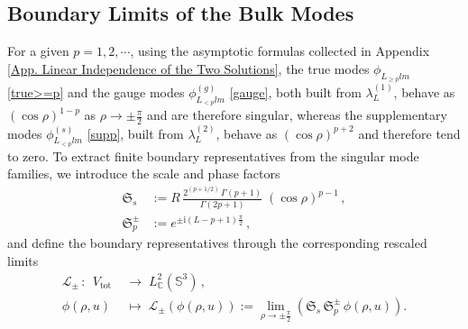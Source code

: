 \documentclass[aps,twocolumn,nofootinbib]{revtex4}
\begin{document}
\subsection{Boundary Limits of the Bulk Modes}

For a given $p=1,2,\cdots$, using the asymptotic formulas collected in Appendix \ref{App. Linear Independence of the Two Solutions}, the true modes $\phi^{}_{L^{}_{\geqslant p}lm}$ \eqref{true>=p} and the gauge modes $\phi^{(g)}_{L^{}_{<p}lm}$ \eqref{gauge}, both built from $\lambda_L^{(1)}$, behave as $(\cos\rho)^{1-p}$ as $\rho\longrightarrow\pm\frac{\pi}{2}$ and are therefore singular, whereas the supplementary modes $\phi^{(s)}_{L^{}_{<p}lm}$ \eqref{supp}, built from $\lambda_L^{(2)}$, behave as $(\cos\rho)^{p+2}$ and therefore tend to zero. To extract finite boundary representatives from the singular mode families, we introduce the scale and phase factors
\begin{align}
    \mathfrak{S}^{}_s &:= R\, \frac{2^{(p+{1}/{2})}\, \Gamma(p+1)}{\Gamma(2p+1)}\; (\cos\rho)^{p-1}\,, \\[3pt]
    \mathfrak{S}^{\pm}_p &:= e^{\pm\mathrm{i}(L-p+1)\frac{\pi}{2}} \,,
\end{align}
and define the boundary representatives through the corresponding rescaled limits
\begin{align}\label{eq:L-def}
    \!\mathcal{L}_\pm \,\colon\;\, V_{\text{tot}} &\;\longrightarrow\; L^2_{\mathbb{C}}(\mathbb{S}^3)\,, \nonumber\\[3pt]
    \phi(\rho,u) &\;\longmapsto\; \mathcal{L}_\pm\left(\phi(\rho,u)\right) := \lim_{\rho\longrightarrow\pm\frac{\pi}{2}} \left(\mathfrak{S}^{}_s\,\mathfrak{S}^\pm_p\, \phi(\rho,u)\right) .
\end{align}
\end{document}
